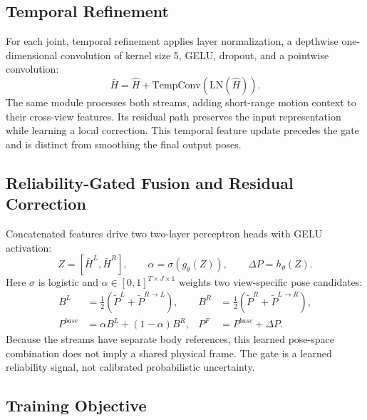 \documentclass[preprint,12pt]{elsarticle}
\begin{document}
\subsection{Temporal Refinement}
\label{subsec:temporal_refinement}

For each joint, temporal refinement applies layer normalization, a depthwise one-dimensional convolution of kernel size 5, GELU, dropout, and a pointwise convolution:
\[
\bar{H} = \hat{H} + \mathrm{TempConv}(\mathrm{LN}(\hat{H})).
\]
The same module processes both streams, adding short-range motion context to their cross-view features. Its residual path preserves the input representation while learning a local correction. This temporal feature update precedes the gate and is distinct from smoothing the final output poses.

\subsection{Reliability-Gated Fusion and Residual Correction}
\label{subsec:reliability_fusion}

Concatenated features drive two two-layer perceptron heads with GELU activation:
\[
Z=[\bar{H}^{L},\bar{H}^{R}],\qquad
\alpha=\sigma(g_{\theta}(Z)),\qquad
\Delta P=h_{\theta}(Z).
\]
Here \(\sigma\) is logistic and \(\alpha\in[0,1]^{T\times J\times1}\) weights two view-specific pose candidates:
\[
\begin{aligned}
B^{L}&=\tfrac12(\tilde{P}^{L}+\tilde{P}^{R\rightarrow L}),&
B^{R}&=\tfrac12(\tilde{P}^{R}+\tilde{P}^{L\rightarrow R}),\\
P^{base}&=\alpha B^{L}+(1-\alpha)B^{R},&
P^{F}&=P^{base}+\Delta P.
\end{aligned}
\]
Because the streams have separate body references, this learned pose-space combination does not imply a shared physical frame. The gate is a learned reliability signal, not calibrated probabilistic uncertainty.

\subsection{Training Objective}
\label{subsec:training_objective}
\end{document}
